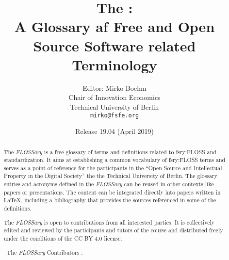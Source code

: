 \documentclass[a4paper]{article}
\title{The \flossary:\\
  A Glossary af Free and Open Source Software related Terminology}
\author{Editor: Mirko Boehm\\
  Chair of Innovation Economics\\
  Technical University of Berlin\\
  \texttt{mirko@fsfe.org}}
\date{Release 19.04 (April 2019)}
\newcommand{\flossary}{{\em FLOSSary} }
\begin{document}
\maketitle \thispagestyle{empty}
\begin{abstract}
  \noindent
  The \flossary is a free glossary of terms and definitions related to
  \gls{fsry:FLOSS} and standardization. It aims at establishing a
  common vocabulary of \gls{fsry:FLOSS} terms and serves as a point of
  reference for the participants in the ``Open Source and Intellectual
  Property in the Digital Society'' the the Technical University of
  Berlin. The glossary entries and acronyms defined in the \flossary
  can be reused in other contexts like papers or presentations. The
  content can be integrated directly into papers written in \LaTeX,
  including a bibliography that provides the sources referenced in
  some of the definitions.

  The \flossary is open to contributions from all interested
  parties. It is collectively edited and reviewed by the participants
  and tutors of the course and distributed freely under the conditions
  of the CC BY 4.0 license.

  \vspace{0.5cm}
  \noindent \textcopyright~The \flossary Contributors \ccby:
  \\ 
\end{abstract}

\clearpage
\glsaddall
{}
\printnoidxglossary[nonumberlist]
\clearpage
\printnoidxglossary[type=\acronymtype,nonumberlist]
\clearpage
\printbibliography
\end{document}
